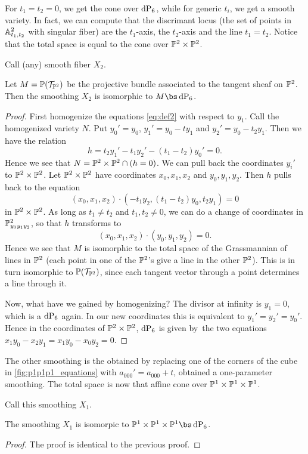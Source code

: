 For $t_1=t_2=0$, we get the cone over $\dP6$, while for generic $t_i$, we get a smooth variety. In fact, we can compute that the discrimant locus (the set of points in $\A^2_{t_1,t_2}$ with singular fiber) are the $t_1$-axis, the $t_2$-axis and the line $t_1=t_2$. Notice that the total space is equal to the cone over $\P^2 \times \P^2$.

Call (any) smooth fiber $X_2$. 

\begin{lemma}
Let $M=\P(\mathcal T_ {\P^2})$ be the projective bundle associated to the tangent sheaf on $\P^2$. Then the smoothing $X_2$ is isomorphic to $M \bs \dP6$. 
\end{lemma}
\begin{proof}
First homogenize the equations \eqref{eq:def2} with respect to $y_1$. Call the homogenized variety $N$. Put $y_0'=y_0$, $y_1' = y_0-ty_1$ and $y_2'=y_0-t_2y_1$. Then we have the relation
\[
h = t_2y_1'-t_1y_2' - (t_1-t_2)y_0' = 0.
\]
Hence we see that $N=\P^2 \times \P^2 \cap (h = 0)$. We can pull back the coordinates $y_i'$ to $\P^2 \times \P^2$. Let $\P^2 \times \P^2$ have coordinates $x_0,x_1,x_2$ and $y_0,y_1,y_2$. Then $h$ pulls back to the equation
\[
(x_0,x_1,x_2) \cdot (-t_1y_2, (t_1-t_2)y_0,t_2y_1) = 0
\]
in $\P^2 \times \P^2$. As long as $t_1 \neq t_2$ and $t_1,t_2 \neq 0$, we can do a change of coordinates in $\P^2_{y_0y_1y_2}$, so that $h$ transforms to
\[
(x_0,x_1,x_2) \cdot(y_0,y_1,y_2) = 0.
\]
Hence we see that $M$ is isomorphic to the total space of the Grassmannian of lines in $\P^2$ (each point in one of the $\P^2$'s give a line in the other $\P^2$). This is in turn isomorphic to $\P(\mathcal T_{\P^2})$, since each tangent vector through a point determines a line through it.

Now, what have we gained by homogenizing? The divisor at infinity is $y_1=0$, which is a $\dP6$ again. In our new coordinates this is equivalent to $y_1'=y_2'=y_0'$. Hence in the coordinates of $\P^2 \times \P^2$, $\dP6$ is given by the two equations $x_1y_0-x_2y_1=x_1y_0-x_0y_2=0$. 
\end{proof}

The other smoothing is the obtained by replacing one of the corners of the cube in \cref{fig:p1p1p1_equations} with $a_{000}'=a_{000}+t$, obtained a one-parameter smoothing. The total space is now that affine cone over $\P^1 \times \P^1 \times \P^1$. 

Call this smoothing $X_1.$

\begin{lemma}
The smoothing $X_1$ is isomorpic to $\P^1 \times \P^1 \times \P^1 \bs \dP6$.
\end{lemma}
\begin{proof}
The proof is identical to the previous proof.
\end{proof}

